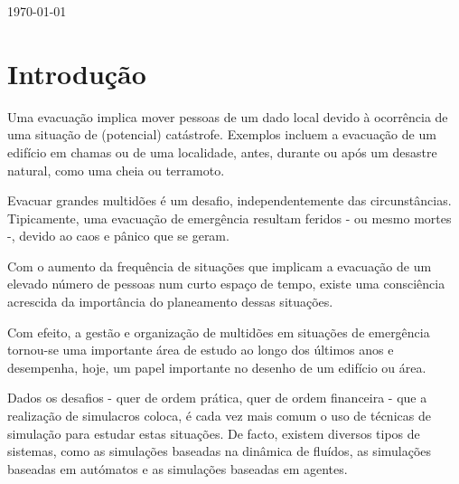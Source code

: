 \documentclass[12pt]{article}
\begin{document}
\begin{titlepage}

{\large \today}\\[0cm] %


\clearpage 

\tableofcontents

\clearpage 
\justify\normalsize

\section{Introdução} 

Uma evacuação implica mover pessoas de um dado local devido à ocorrência de uma situação de (potencial) catástrofe. Exemplos incluem a evacuação de um edifício em chamas ou de uma localidade, antes, durante ou após um desastre natural, como uma cheia ou terramoto. 

Evacuar grandes multidões é um desafio, independentemente das circunstâncias. Tipicamente, uma evacuação de emergência resultam feridos - ou mesmo mortes -, devido ao caos e pânico que se geram.

Com o aumento da frequência de situações que implicam a evacuação de um elevado número de pessoas num curto espaço de tempo, existe uma consciência acrescida da importância do planeamento dessas situações.

Com efeito, a gestão e organização de multidões em situações de emergência tornou-se uma importante área de estudo ao longo dos últimos anos e desempenha, hoje, um papel importante no desenho de um edifício ou área.

Dados os desafios - quer de ordem prática, quer de ordem financeira - que a realização de simulacros coloca, é cada vez mais comum o uso de técnicas de simulação para estudar estas situações. De facto, existem diversos tipos de sistemas, como as simulações baseadas na dinâmica de fluídos, as simulações baseadas em autómatos e as simulações baseadas em agentes.


\end{titlepage}
\end{document}
